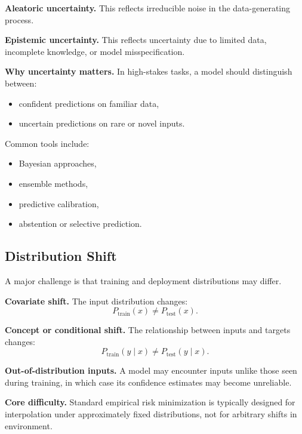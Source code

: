 \medskip

\noindent
\textbf{Aleatoric uncertainty.}
This reflects irreducible noise in the data-generating process.

\medskip

\noindent
\textbf{Epistemic uncertainty.}
This reflects uncertainty due to limited data, incomplete knowledge, or model misspecification.

\medskip

\noindent
\textbf{Why uncertainty matters.}
In high-stakes tasks, a model should distinguish between:
\begin{itemize}
    \item confident predictions on familiar data,
    \item uncertain predictions on rare or novel inputs.
\end{itemize}

\medskip

\noindent
Common tools include:
\begin{itemize}
    \item Bayesian approaches,
    \item ensemble methods,
    \item predictive calibration,
    \item abstention or selective prediction.
\end{itemize}

\subsection{Distribution Shift}

A major challenge is that training and deployment distributions may differ.

\medskip

\noindent
\textbf{Covariate shift.}
The input distribution changes:
\[
P_{\mathrm{train}}(x) \neq P_{\mathrm{test}}(x).
\]

\medskip

\noindent
\textbf{Concept or conditional shift.}
The relationship between inputs and targets changes:
\[
P_{\mathrm{train}}(y \mid x) \neq P_{\mathrm{test}}(y \mid x).
\]

\medskip

\noindent
\textbf{Out-of-distribution inputs.}
A model may encounter inputs unlike those seen during training, in which case its confidence estimates may become unreliable.

\medskip

\noindent
\textbf{Core difficulty.}
Standard empirical risk minimization is typically designed for interpolation under approximately fixed distributions, not for arbitrary shifts in environment.

